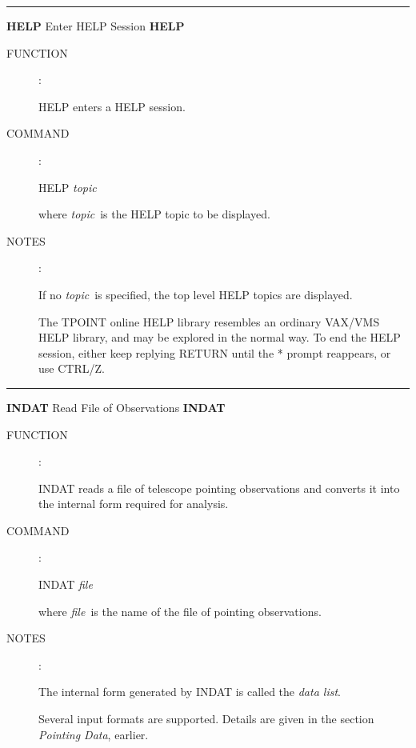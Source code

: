 
\goodbreak
\rule{\textwidth}{0.3mm}
{\Large {\bf HELP} \hfill Enter HELP Session \hfill {\bf HELP}}
\begin{description}
\item [FUNCTION]:

HELP enters a HELP session.

\item [COMMAND]:

\begin{cmd}
\> \> HELP {\it topic}
\end{cmd}

where {\it topic}\, is the HELP topic to be displayed.

\item [NOTES]:

If no {\it topic}\, is specified, the top level HELP topics are
displayed.

The TPOINT online HELP library resembles an ordinary VAX/VMS HELP
library, and may be explored in the normal way.  To end the
HELP session, either keep replying RETURN until the * prompt
reappears, or use CTRL/Z.

\end{description}


\goodbreak
\rule{\textwidth}{0.3mm}
{\Large {\bf INDAT} \hfill Read File of Observations \hfill {\bf INDAT}}
\begin{description}
\item [FUNCTION]:

INDAT reads a file of telescope pointing
observations and converts it into the internal form required
for analysis.

\item [COMMAND]:

\begin{cmd}
\> \> INDAT {\it file}
\end{cmd}

where {\it file}\, is the name of the file of pointing observations.

\item [NOTES]:

The internal form generated by INDAT is called the {\it data list}.

Several input formats are supported.  Details are given
in the section {\it Pointing Data}, earlier.

\end{description}

